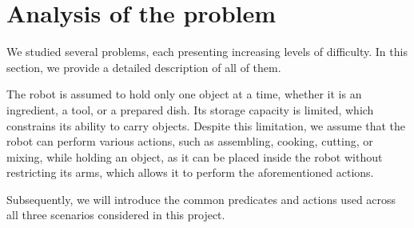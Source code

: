 \section{Analysis of the problem}

We studied several problems, each presenting increasing levels of difficulty. In this section, we provide a detailed description of 
all of them. 

The robot is assumed to hold only one object at a time, whether it is an ingredient, a tool, or a prepared dish. Its storage capacity is
 limited, which constrains its ability to carry objects. Despite this limitation, we assume that the robot can perform various actions,
  such as assembling, cooking, cutting, or mixing, while holding an object, as it can be placed inside the robot without restricting its
   arms, which allows it to perform the aforementioned actions.

Subsequently, we will introduce the common predicates and actions used across all three scenarios considered in this project.
